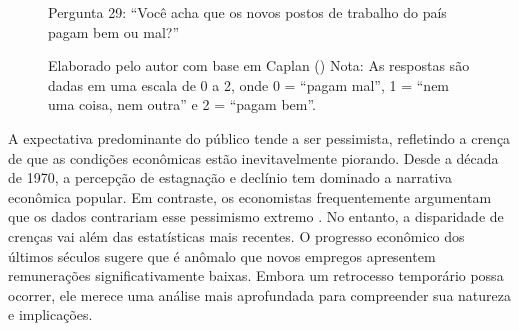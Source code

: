 \begin{figure}[H]
    \centering
    \caption*{Pergunta 29: “Você acha que os novos postos de trabalho do país pagam bem ou mal?”}
    \caption{Elaborado pelo autor com base em Caplan (\citeyear{The_Myth_of_the_Rational_Voter}) \newline
    Nota: As respostas são dadas em uma escala de 0 a 2, onde 0 = “pagam mal”, 1 = “nem uma coisa, nem outra” e 2 = “pagam bem”.}
    \label{fig:pergunta_29}
\end{figure}

A expectativa predominante do público tende a ser pessimista, refletindo a crença de que as condições econômicas estão inevitavelmente piorando. Desde a década de 1970, a percepção de estagnação e declínio tem dominado a narrativa econômica popular. Em contraste, os economistas frequentemente argumentam que os dados contrariam esse pessimismo extremo \cite{Myths-of-Rich-and-Poor}. No entanto, a disparidade de crenças vai além das estatísticas mais recentes. O progresso econômico dos últimos séculos sugere que é anômalo que novos empregos apresentem remunerações significativamente baixas. Embora um retrocesso temporário possa ocorrer, ele merece uma análise mais aprofundada para compreender sua natureza e implicações.



